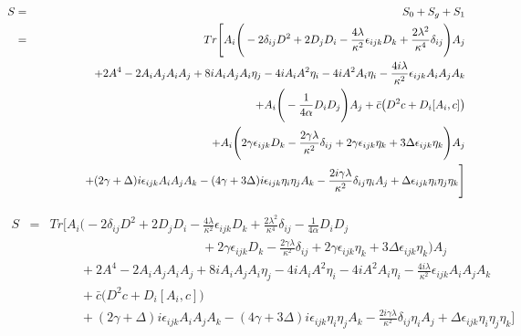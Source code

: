\documentclass[a4paper,11pt]{article} %
\numberwithin{equation}{section} %
\numberwithin{figure}{section} %
\theoremstyle{plain} %
\theoremstyle{definition} %
\theoremstyle{remark} %
\begin{document}
\begin{eqnarray*}
 S &=& S_0 + S_g + S_1 \\
   &=& Tr\Bigg[ A_i \Bigg( - 2 \delta_{ij} D^2 + 2 D_j D_i - \frac{4\lambda}{\kappa^2} \epsilon_{ijk}  D_k + \frac{2\lambda^2}{\kappa^4} \delta_{ij} \Bigg) A_j \\
   && \hspace{15mm} + 2 A^4 -2 A_i A_j A_i A_j + 8i A_i A_j A_i \eta_j - 4i A_i A^2 \eta_i - 4i A^2 A_i \eta_i - \frac{4i\lambda}{\kappa^2} \epsilon_{ijk} A_i A_j A_k \\
   && \hspace{1cm} + A_i \Bigg( - \frac{1}{4 \alpha} D_i D_j \Bigg) A_j + \bar{c} \big( D^2 c +D_i [A_i , c] \big) \\
   && \hspace{1cm} + A_i \Bigg( 2 \gamma \epsilon_{ijk} D_k - \frac{2 \gamma \lambda}{\kappa^{2}} \delta_{ij} + 2 \gamma \epsilon_{ijk} \eta_{k} + 3 \Delta \epsilon_{ijk} \eta_k \Bigg) A_j \\ 
   && \hspace{15mm} + ( 2 \gamma + \Delta ) i \epsilon_{ijk} A_i A_j A_k - ( 4 \gamma + 3 \Delta ) i \epsilon_{ijk} \eta_i \eta_j A_k - \frac{2i \gamma \lambda}{\kappa^2} \delta_{ij} \eta_i A_j + \Delta \epsilon_{ijk} \eta_{i} \eta_j \eta_k \Bigg]
\end{eqnarray*}

\begin{eqnarray*}
 S &=& Tr \Bigg[ A_i \Bigg( - 2 \delta_{ij} D^2 + 2 D_j D_i - \frac{4\lambda}{\kappa^2} \epsilon_{ijk}  D_k + \frac{2\lambda^2}{\kappa^4} \delta_{ij} - \frac{1}{4 \alpha} D_i D_j \\
   && \hspace{5cm} + 2 \gamma \epsilon_{ijk} D_k - \frac{2 \gamma \lambda}{\kappa^{2}} \delta_{ij} + 2 \gamma \epsilon_{ijk} \eta_{k} + 3 \Delta \epsilon_{ijk} \eta_k \Bigg) A_j \\
   && \hspace{1cm} + 2 A^4 -2 A_i A_j A_i A_j + 8i A_i A_j A_i \eta_j - 4i A_i A^2 \eta_i - 4i A^2 A_i \eta_i - \frac{4i\lambda}{\kappa^2} \epsilon_{ijk} A_i A_j A_k \\
   && \hspace{1cm} + \bar{c} \big( D^2 c +D_i [A_i , c] \big) \\
   && \hspace{1cm} + ( 2 \gamma + \Delta ) i \epsilon_{ijk} A_i A_j A_k - ( 4 \gamma + 3 \Delta ) i \epsilon_{ijk} \eta_i \eta_j A_k - \frac{2i \gamma \lambda}{\kappa^2} \delta_{ij} \eta_i A_j + \Delta \epsilon_{ijk} \eta_{i} \eta_j \eta_k \Bigg] 
\end{eqnarray*}
\end{document}
